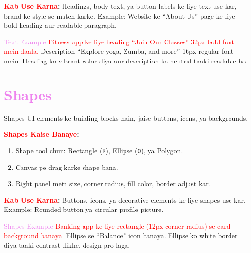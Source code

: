 \documentclass[a4paper]{article}
\begin{document}
\textbf{\textcolor{red}{Kab Use Karna}:}
\textcolor{examplegreen}{Headings, body text, ya button labels ke liye text use kar, brand ke style se match karke.} Example: Website ke “About Us” page ke liye bold heading aur readable paragraph.

\begin{examplebox}{\textcolor{violet}{Text Example}}
\textcolor{red}{Fitness app ke liye heading “Join Our Classes” 32px bold font mein daala.} Description “Explore yoga, Zumba, and more” 16px regular font mein. \textcolor{examplegreen}{Heading ko vibrant color diya aur description ko neutral taaki readable ho.}
\end{examplebox}

\section*{\textbf{\LARGE \textcolor{violet}{Shapes}}}
\textcolor{warningred}{Shapes UI elements ke building blocks hain, jaise buttons, icons, ya backgrounds.}

\textbf{\textcolor{red}{Shapes Kaise Banaye}:}
\begin{enumerate}
  \item \textcolor{examplegreen}{Shape tool chun: Rectangle (\texttt{R}), Ellipse (\texttt{O}), ya Polygon.}
  \item \textcolor{examplegreen}{Canvas pe drag karke shape bana.}
  \item \textcolor{examplegreen}{Right panel mein size, corner radius, fill color, border adjust kar.}
\end{enumerate}

\textbf{\textcolor{red}{Kab Use Karna}:}
\textcolor{examplegreen}{Buttons, icons, ya decorative elements ke liye shapes use kar.} Example: Rounded button ya circular profile picture.

\begin{examplebox}{\textcolor{violet}{Shapes Example}}
\textcolor{red}{Banking app ke liye rectangle (12px corner radius) se card background banaya.} Ellipse se “Balance” icon banaya. \textcolor{examplegreen}{Ellipse ko white border diya taaki contrast dikhe, design pro laga.}
\end{examplebox}

\end{document}
